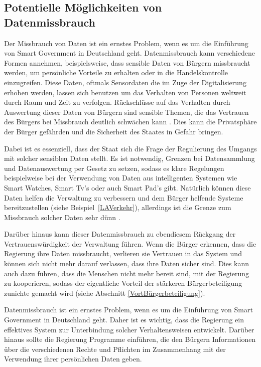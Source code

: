 \subsection{Potentielle Möglichkeiten von Datenmissbrauch}
Der Missbrauch von Daten ist ein ernstes Problem, wenn es um die Einführung von Smart Government in Deutschland geht.
Datenmissbrauch kann verschiedene Formen annehmen, beispielsweise, dass sensible Daten von Bürgern missbraucht werden, um persönliche Vorteile zu erhalten oder in die Handelskontrolle einzugreifen.
Diese Daten, oftmals Sensordaten die im Zuge der Digitalisierung erhoben werden, lassen sich benutzen um das Verhalten von Personen weltweit durch Raum und Zeit zu verfolgen.
Rückschlüsse auf das Verhalten durch Auswertung dieser Daten von Bürgern sind sensible Themen, die das Vertrauen des Bürgers bei Missbrauch deutlich schwächen kann \citep[Vgl.][S.179]{von_Lucke_2016}.
Dies kann die Privatsphäre der Bürger gefährden und die Sicherheit des Staates in Gefahr bringen.
\par
Dabei ist es essenziell, dass der Staat sich die Frage der Regulierung des Umgangs mit solcher sensiblen Daten stellt.
Es ist notwendig, Grenzen bei Datensammlung und Datenauswertung  per Gesetz zu setzen, sodass es klare Regelungen beispielweise bei der Verwendung von Daten aus intelligenten Systemen wie Smart Watches, Smart Tv's oder auch Smart Pad's gibt.
Natürlich können diese Daten helfen die Verwaltung zu verbessern und dem Bürger helfende Systeme bereitzustellen (siehe Beispiel~\ref{LAVerkehr}), allerdings ist die Grenze zum Missbrauch solcher Daten sehr dünn \citep[Vgl.][S.~39]{Lucke2016}.
\par
Darüber hinaus kann dieser Datenmissbrauch zu ebendiesem Rückgang der Vertrauenswürdigkeit der Verwaltung führen.
Wenn die Bürger erkennen, dass die Regierung ihre Daten missbraucht, verlieren sie Vertrauen in das System und können sich nicht mehr darauf verlassen, dass ihre Daten sicher sind.
Dies kann auch dazu führen, dass die Menschen nicht mehr bereit sind, mit der Regierung zu kooperieren, sodass der eigentliche Vorteil der stärkeren Bürgerbeteiligung zunichte gemacht wird (siehe Abschnitt \ref{VortBürgerbeteiligung}).
\par
Datenmissbrauch ist ein ernstes Problem, wenn es um die Einführung von Smart Government in Deutschland geht.
Daher ist es wichtig, dass die Regierung ein effektives System zur Unterbindung solcher Verhaltensweisen entwickelt.
Darüber hinaus sollte die Regierung Programme einführen, die den Bürgern Informationen über die verschiedenen Rechte und Pflichten im Zusammenhang mit der Verwendung ihrer persönlichen Daten geben.